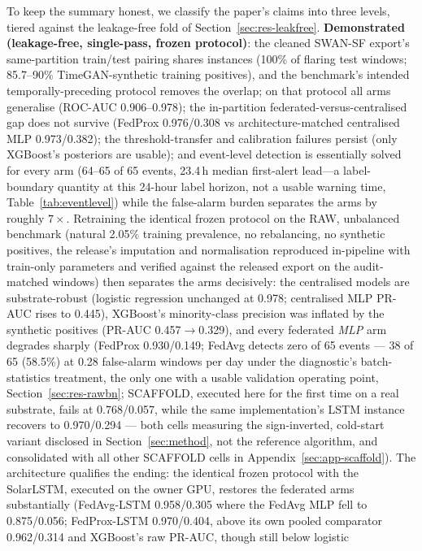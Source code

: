 To keep the summary honest, we classify the paper's claims into three
levels, tiered against the leakage-free fold of
Section~\ref{sec:res-leakfree}. \textbf{Demonstrated (leakage-free,
single-pass, frozen protocol)}: the cleaned SWAN-SF export's
same-partition train/test pairing shares instances (100\% of flaring
test windows; 85.7--90\% TimeGAN-synthetic training positives), and
the benchmark's intended temporally-preceding protocol removes the
overlap; on that protocol all arms generalise (ROC-AUC 0.906--0.978);
the in-partition federated-versus-centralised gap does not survive
(FedProx 0.976/0.308 vs architecture-matched centralised MLP
0.973/0.382); the threshold-transfer and
calibration failures persist (only XGBoost's posteriors are usable);
and event-level detection is essentially solved for every arm (64--65
of 65 events, 23.4\,h median first-alert lead---a label-boundary
quantity at this 24-hour label horizon, not a usable warning time,
Table~\ref{tab:eventlevel}) while the false-alarm burden
separates the arms by roughly $7\times$. Retraining the identical
frozen protocol on the RAW, unbalanced benchmark (natural 2.05\%
training prevalence, no rebalancing, no synthetic positives, the
release's imputation and normalisation reproduced in-pipeline with
train-only parameters and verified against the released export on
the audit-matched windows) then separates the arms decisively: the
centralised models are substrate-robust (logistic regression
unchanged at 0.978; centralised MLP PR-AUC rises to 0.445),
XGBoost's minority-class precision was inflated by the synthetic
positives (PR-AUC 0.457$\to$0.329), and every federated \emph{MLP}
arm degrades sharply (FedProx 0.930/0.149; FedAvg detects zero of 65
events --- 38 of 65 (58.5\%) at 0.28 false-alarm windows per day
under the diagnostic's batch-statistics treatment, the only one with
a usable validation operating point, Section~\ref{sec:res-rawbn};
SCAFFOLD, executed here for the first time on a real
substrate, fails at 0.768/0.057, while the same implementation's
LSTM instance recovers to 0.970/0.294 --- both cells measuring the
sign-inverted, cold-start variant disclosed in
Section~\ref{sec:method}, not the reference algorithm, and
consolidated with all other SCAFFOLD cells in
Appendix~\ref{sec:app-scaffold}). The
architecture qualifies the
ending: the identical frozen protocol with the SolarLSTM, executed
on the owner GPU, restores the federated arms substantially
(FedAvg-LSTM 0.958/0.305 where the FedAvg MLP fell to 0.875/0.056;
FedProx-LSTM 0.970/0.404, above its own pooled comparator
0.962/0.314 and XGBoost's raw PR-AUC, though still below logistic
